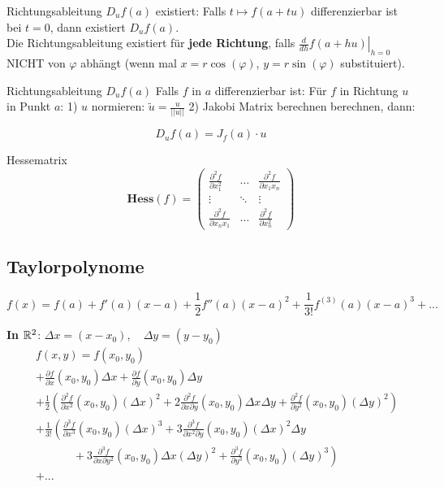 \begin{Rezept}{Richtungsableitung $D_uf(a)$ existiert:}{} Falls $t \mapsto f(a + tu)$ differenzierbar ist bei $t=0$, dann existiert $D_uf(a)$.\\

	Die Richtungsableitung existiert für \textbf{jede Richtung}, falls $\left.\frac{d}{dh} f(a + hu) \right|_{h=0}$ NICHT von $\varphi$ abhängt (wenn mal $x=r\cos(\varphi)$, $y=r\sin(\varphi)$ substituiert).
\end{Rezept}

\begin{Rezept}{Richtungsableitung $D_u f(a)$}{}
Falls $f$ in $a$ differenzierbar ist: Für $f$ in Richtung $u$ in Punkt $a$: 1) $u$ normieren: $\tilde{u} = \frac{u}{||u||}$ 2) Jakobi Matrix berechnen berechnen, dann:

\[
    D_u f(a) = J_f(a) \cdot u
\]
\end{Rezept}

\begin{Definition}{Hessematrix}{}
\[
    \mathbf{Hess}(f) =
        \begin{pmatrix}
            \frac{\partial^2 f}{\partial x_1^2}&\hdots&\frac{\partial^2 f}{\partial x_1 x_n}\\
            \vdots&\ddots&\vdots\\
            \frac{\partial^2 f}{\partial x_n x_1}&\hdots&\frac{\partial^2 f}{\partial x_n^2}
        \end{pmatrix}
\]
\end{Definition}

\subsection{Taylorpolynome}

\[
    f(x) = f(a) + f'(a)(x-a) + \frac{1}{2} f''(a)(x-a)^2 + \frac{1}{3!} f^{(3)}(a)(x-a)^3 + ...
\]

\textbf{In $\mathbb{R}^2$}: $\Delta x = (x - x_0)$, ~ $\Delta y = (y - y_0)$
\begin{align*}
    \; & f(x, y) =f(x_0, y_0)\\ &+ \frac{\partial f}{\partial x}(x_0,y_0) \Delta x + \frac{\partial f}{\partial y}(x_0,y_0) \Delta y\\
    &+ \frac{1}{2} \left(\frac{\partial^2 f}{\partial x^2}(x_0,y_0) (\Delta x)^2 + 2\frac{\partial^2 f}{\partial x \partial y}(x_0,y_0) \Delta x \Delta y + \frac{\partial^2 f}{\partial y^2}(x_0,y_0) (\Delta y)^2\right)\\
    &+ \frac{1}{3!} \left(\frac{\partial^3 f}{\partial x^3}(x_0,y_0) (\Delta x)^3 + 3\frac{\partial^3 f}{\partial x^2 \partial y}(x_0,y_0) (\Delta x)^2 \Delta y\right.\\
    &\quad\quad\quad\;+ \left.3\frac{\partial^3 f}{\partial x \partial y^2}(x_0,y_0) \Delta x (\Delta y)^2 + \frac{\partial^3 f}{\partial y^3}(x_0,y_0) (\Delta y)^3\right)\\
    & + ...
\end{align*}

